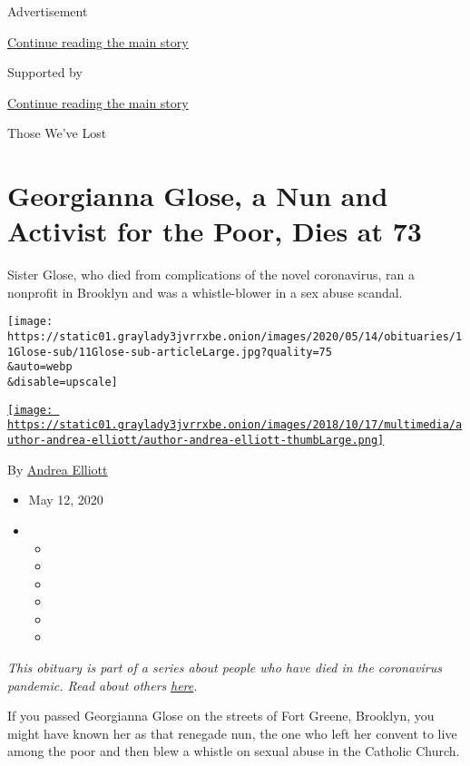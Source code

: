 Advertisement

\protect\hyperlink{after-top}{Continue reading the main story}

Supported by

\protect\hyperlink{after-sponsor}{Continue reading the main story}

Those We've Lost

\hypertarget{georgianna-glose-a-nun-and-activist-for-the-poor-dies-at-73}{%
\section{Georgianna Glose, a Nun and Activist for the Poor, Dies at
73}\label{georgianna-glose-a-nun-and-activist-for-the-poor-dies-at-73}}

Sister Glose, who died from complications of the novel coronavirus, ran
a nonprofit in Brooklyn and was a whistle-blower in a sex abuse scandal.

\texttt{[image: https://static01.graylady3jvrrxbe.onion/images/2020/05/14/obituaries/11Glose-sub/11Glose-sub-articleLarge.jpg?quality=75\\\&auto=webp\\\&disable=upscale]}

\href{https://www.nytimes3xbfgragh.onion/by/andrea-elliott}{\texttt{[image: https://static01.graylady3jvrrxbe.onion/images/2018/10/17/multimedia/author-andrea-elliott/author-andrea-elliott-thumbLarge.png]}}

By \href{https://www.nytimes3xbfgragh.onion/by/andrea-elliott}{Andrea
Elliott}

\begin{itemize}
\item
  May 12, 2020
\item
  \begin{itemize}
  \item
  \item
  \item
  \item
  \item
  \item
  \end{itemize}
\end{itemize}

\emph{This obituary is part of a series about people who have died in
the coronavirus pandemic. Read about others}
\href{https://www.nytimes3xbfgragh.onion/series/people-who-have-died-of-the-coronavirus}{\emph{here}}\emph{.}

If you passed Georgianna Glose on the streets of Fort Greene, Brooklyn,
you might have known her as that renegade nun, the one who left her
convent to live among the poor and then blew a whistle on sexual abuse
in the Catholic Church.

